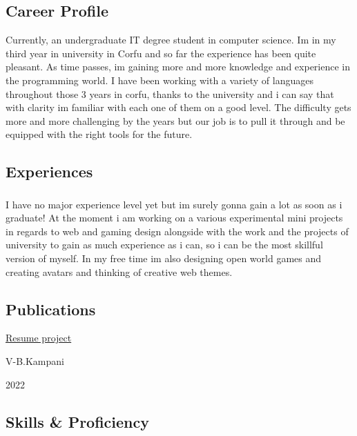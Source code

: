 \documentclass[english,]{article}
\begin{document}
\hypertarget{career-profile}{%
\subsection{\texorpdfstring{{ \emph{} \emph{} } Career
Profile}{    Career Profile}}\label{career-profile}}

Currently, an undergraduate IT degree student in computer science. Im in
my third year in university in Corfu and so far the experience has been
quite pleasant. As time passes, im gaining more and more knowledge and
experience in the programming world. I have been working with a variety
of languages throughout those 3 years in corfu, thanks to the university
and i can say that with clarity im familiar with each one of them on a
good level. The difficulty gets more and more challenging by the years
but our job is to pull it through and be equipped with the right tools
for the future.

\hypertarget{experiences}{%
\subsection{\texorpdfstring{{ \emph{} \emph{} }
Experiences}{    Experiences}}\label{experiences}}

\hypertarget{section-2}{%
\subsubsection{}\label{section-2}}

I have no major experience level yet but im surely gonna gain a lot as
soon as i graduate! At the moment i am working on a various experimental
mini projects in regards to web and gaming design alongside with the
work and the projects of university to gain as much experience as i can,
so i can be the most skillful version of myself. In my free time im also
designing open world games and creating avatars and thinking of creative
web themes.

\hypertarget{publications}{%
\subsection{\texorpdfstring{{ \emph{} \emph{} }
Publications}{    Publications}}\label{publications}}

\href{https://vasiliskampani.github.io/online-cv/}{Resume project}

V-B.Kampani

2022

\hypertarget{skills-proficiency}{%
\subsection{\texorpdfstring{{ \emph{} \emph{} } Skills \&
Proficiency}{    Skills \& Proficiency}}\label{skills-proficiency}}
\end{document}
